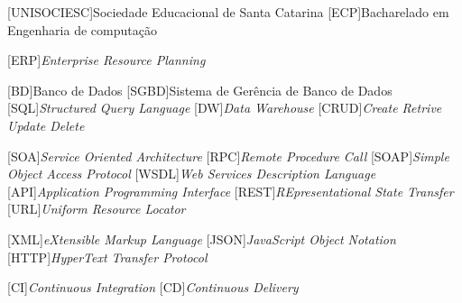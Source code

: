 
[UNISOCIESC]{Sociedade Educacional de Santa Catarina}
[ECP]{Bacharelado em Engenharia de computação}

[ERP]{\emph{Enterprise Resource Planning}}

[BD]{Banco de Dados}
[SGBD]{Sistema de Gerência de Banco de Dados}
[SQL]{\emph{Structured Query Language}}
[DW]{\emph{Data Warehouse}}
[CRUD]{\emph{Create Retrive Update Delete}}

[SOA]{\emph{Service Oriented Architecture}}
[RPC]{\emph{Remote Procedure Call}}
[SOAP]{\emph{Simple Object Access Protocol}}
[WSDL]{\emph{Web Services Description Language}}
[API]{\emph{Application Programming Interface}}
[REST]{\emph{REpresentational State Transfer}}
[URL]{\emph{Uniform Resource Locator}}

[XML]{\emph{eXtensible Markup Language}}
[JSON]{\emph{JavaScript Object Notation}}
[HTTP]{\emph{HyperText Transfer Protocol}}

[CI]{\emph{Continuous Integration}}
[CD]{\emph{Continuous Delivery}}
